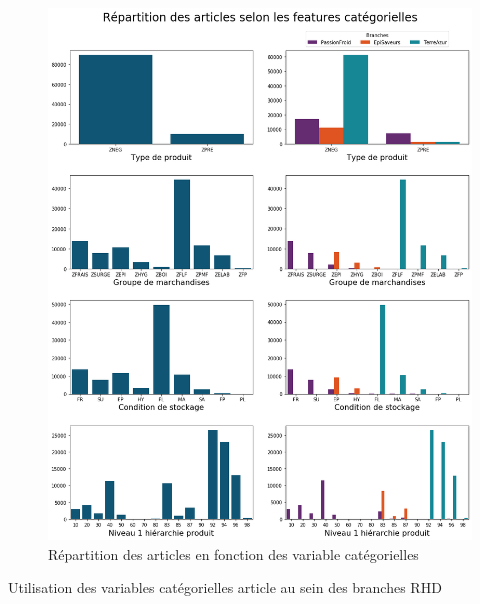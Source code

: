             \begin{figure}[htbp]
                \begin{center}
                \includegraphics[width=\linewidth]{img/Repartition articles categories.png}
                \end{center}
                \caption{Répartition des articles en fonction des variable catégorielles}
                \label{fig:repart_art_categ}
            \end{figure}

            \begin{table}[htbp]
                \footnotesize
                \begin{center}
                
                \vspace{5pt}
                
                \vspace{5pt}
                
                \vspace{5pt}
                
                \end{center}
                \caption{Utilisation des variables catégorielles article au sein des branches RHD}
                \label{tab:repart_art_categ}
                \normalsize
            \end{table}

